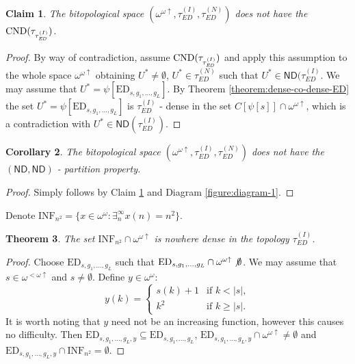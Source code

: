 \documentclass[12pt]{amsart}
\theoremstyle{plain}
\newtheorem{theorem}{Theorem}[section]
\newtheorem{corollary}[theorem]{Corollary}
\newtheorem{claim}[theorem]{Claim}
\theoremstyle{definition}
\theoremstyle{remark}
\newcommand{\baire}{\omega^{\omega}}
\newcommand{\finincrbaire}{\omega^{< \omega \uparrow}}
\newcommand{\incrbaire}{\omega^{\omega \uparrow}}
\newcommand{\ND}{\mathsf{ND}}
\newcommand{\EventuallyDifferent}[2]{\mathrm{ED}_{#1,#2}}
\newcommand{\EventuallyDifferentNative}{\tau_{\mathit{ED}}^{(N)}}
\newcommand{\EventuallyDifferentInduced}{\tau_{\mathit{ED}}^{(I)}}
\newcommand{\INFSquare}{\mathrm{INF}_{n^2}}
\newcommand{\PiqueProperty}[2]{\mathrm{C%
\ifcase#1
ND%
\or MGR%
\else ND%
\fi
}(\tau_{#2})}
\begin{document}
\begin{claim}\label{claim:not-pique-ED}
  The bitopological space $(\incrbaire, \EventuallyDifferentInduced, \EventuallyDifferentNative)$
does not have the $\PiqueProperty{0}{\EventuallyDifferentInduced}$.
\end{claim}
\begin{proof}
  By way of contradiction, assume  $\PiqueProperty{0}{\EventuallyDifferentInduced}$
and apply this assumption to the whole space $\incrbaire$
obtaining $U^* \not= \emptyset$, $U^* \in \EventuallyDifferentNative$
such that $U^* \in \ND(\EventuallyDifferentInduced$.
We may assume that $U^* = \psi[\EventuallyDifferent{s}{g_1,\ldots,g_L}]$.
By Theorem \ref{theorem:dense-co-dense-ED} the set
$U^* = \psi[\EventuallyDifferent{s}{g_1,\ldots,g_L}]$
is $\EventuallyDifferentInduced$ - dense in the set
$C[\psi[s]]\cap\incrbaire$, which is a contradiction with
$U^* \in \ND(\EventuallyDifferentInduced)$.
\end{proof}

\begin{corollary}
The bitopological space
$(\incrbaire, \EventuallyDifferentInduced, \EventuallyDifferentNative)$
does not have the $(\ND,\ND)$ - partition property.
\end{corollary}

\begin{proof}
  Simply follows by Claim \ref{claim:not-pique-ED} and
Diagram \ref{figure:diagram-1}.
\end{proof}

Denote
$\INFSquare = \lbrace x \in \baire\colon \exists^\infty_n x(n) = n^2\rbrace$.
\begin{theorem}
  The set $\INFSquare\cap\incrbaire$ is nowhere dense
in the topology $\EventuallyDifferentInduced$.
\end{theorem}
\begin{proof}
  Choose $\EventuallyDifferent{s}{g_1,\ldots,g_L}$
  such that $\EventuallyDifferent{s}{g_1,\ldots,g_L}\cap\incrbaire \not\emptyset$.
  We may assume that $s \in \finincrbaire$ and $s \not= \emptyset$.
  Define $y \in \baire$:
  \[
  y(k)= \begin{cases}
    s(k) + 1 & \text{if } k < |s|,\\
    k^2  & \text{if } k \geq |s|.
    \end{cases}
   \]
   It is worth noting that $y$ need not be an increasing function,
   however this causes no difficulty.
   Then $\EventuallyDifferent{s}{g_1,\ldots,g_L,y} \subseteq
   \EventuallyDifferent{s}{g_1,\ldots,g_L}$,
   $\EventuallyDifferent{s}{g_1,\ldots,g_L,y} \cap \incrbaire\not=\emptyset$
   and
   $\EventuallyDifferent{s}{g_1,\ldots,g_L,y} \cap \INFSquare = \emptyset$.
 \end{proof}
\end{document}
